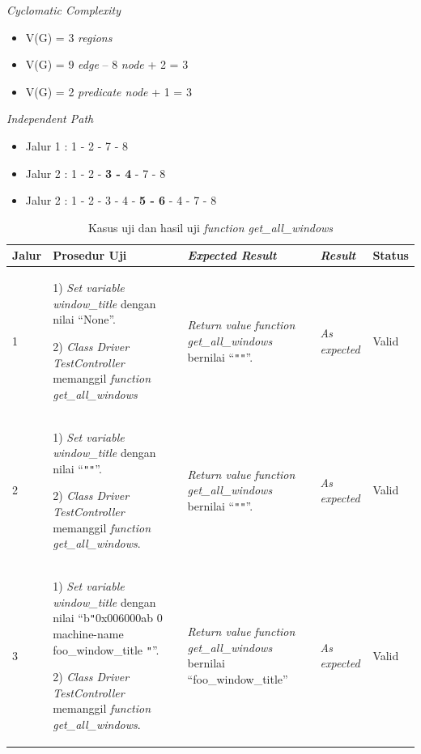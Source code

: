\noindent
\emph{Cyclomatic Complexity}

\begin{itemize}
\item V(G) = 3 \emph{regions}
\item V(G) = 9 \emph{edge} – 8 \emph{node} + 2 = 3
\item V(G) = 2 \emph{predicate node} + 1 = 3
\end{itemize}
\newpage %
\noindent
\emph{Independent Path}

\begin{itemize}
\item Jalur 1 : 1 - 2 - 7 - 8
\item Jalur 2 : 1 - 2 - \textbf{3 - 4} - 7 - 8
\item Jalur 2 : 1 - 2 - 3 - 4 - \textbf{5 - 6} - 4 - 7 - 8
\end{itemize}

\begin{longtable}{|P{.06\textwidth}|P{.30\textwidth}|P{.30\textwidth}|P{.10\textwidth}|P{.08\textwidth}|}
  \caption{Kasus uji dan hasil uji \emph{function get\_all\_windows}}\label{jalur:get_all_windows}\\\hline
  \textbf{Jalur} & \textbf{Prosedur Uji} & \textbf{\emph{Expected Result}} & \textbf{\emph{Result}} & \textbf{Status} \\\hline
  1 & 1) \emph{Set variable window\_title} dengan nilai ``None''.\par\null\par
      2) \emph{Class Driver TestController} memanggil \emph{function get\_all\_windows}
                                         & \emph{Return value} \emph{function get\_all\_windows} bernilai
                                           ``\texttt{""}''. & \emph{As expected} & Valid \\\hline
  2 & 1) \emph{Set variable window\_title} dengan nilai ``\texttt{""}''.\par\null\par
      2) \emph{Class Driver TestController} memanggil \emph{function get\_all\_windows}.
                                         & \emph{Return value} \emph{function get\_all\_windows} bernilai
                                           ``\texttt{""}''. & \emph{As expected} & Valid \\\hline
  3 & 1) \emph{Set variable window\_title} dengan nilai ``b\texttt{"}0x006000ab  0 machine-name
      foo\_window\_title \texttt{"}''.\par\null\par
      2) \emph{Class Driver TestController} memanggil \emph{function get\_all\_windows}.
                                         & \emph{Return value} \emph{function get\_all\_windows} bernilai
                                           ``foo\_window\_title'' & \emph{As expected} & Valid \\\hline
\end{longtable}


